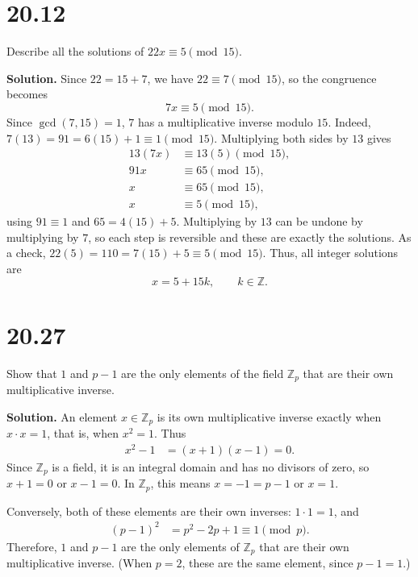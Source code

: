 \documentclass[11pt]{article}
\begin{document}
\section*{20.12}
Describe all the solutions of \(22x\equiv5\pmod{15}\).

\noindent\textbf{Solution.}
Since \(22=15+7\), we have \(22\equiv7\pmod{15}\), so the congruence
becomes
\[
7x\equiv5\pmod{15}.
\]
Since \(\gcd(7,15)=1\), \(7\) has a multiplicative inverse modulo
\(15\). Indeed, \(7(13)=91=6(15)+1\equiv1\pmod{15}\).
Multiplying both sides by \(13\) gives
\[
\begin{aligned}
13(7x)&\equiv13(5)\pmod{15},\\
91x&\equiv65\pmod{15},\\
x&\equiv65\pmod{15},\\
x&\equiv5\pmod{15},
\end{aligned}
\]
using \(91\equiv1\) and \(65=4(15)+5\). Multiplying by \(13\) can be
undone by multiplying by \(7\), so each step is reversible and these are
exactly the solutions. As a check, \(22(5)=110=7(15)+5\equiv5\pmod{15}\).
Thus, all integer solutions are
\[
\boxed{x=5+15k,\qquad k\in\mathbb{Z}.}
\]

\section*{20.27}
Show that $1$ and $p - 1$ are the only elements of the field
$\mathbb{Z}_p$ that are their own multiplicative inverse.

\noindent\textbf{Solution.}
An element $x \in \mathbb{Z}_p$ is its own multiplicative inverse exactly
when $x \cdot x = 1$, that is, when $x^2 = 1$. Thus
\begin{align*}
    x^2 - 1 &= (x + 1)(x - 1) = 0.
\end{align*}
Since $\mathbb{Z}_p$ is a field, it is an integral domain and has no
divisors of zero, so $x + 1 = 0$ or $x - 1 = 0$.
In $\mathbb{Z}_p$, this means $x = -1 = p - 1$ or $x = 1$.

Conversely, both of these elements are their own inverses:
$1 \cdot 1 = 1$, and
\begin{align*}
    (p - 1)^2 &= p^2 - 2p + 1 \equiv 1 \pmod{p}.
\end{align*}
Therefore, $1$ and $p - 1$ are the only elements of $\mathbb{Z}_p$ that
are their own multiplicative inverse. (When $p = 2$, these are the same
element, since $p - 1 = 1$.)
\end{document}
